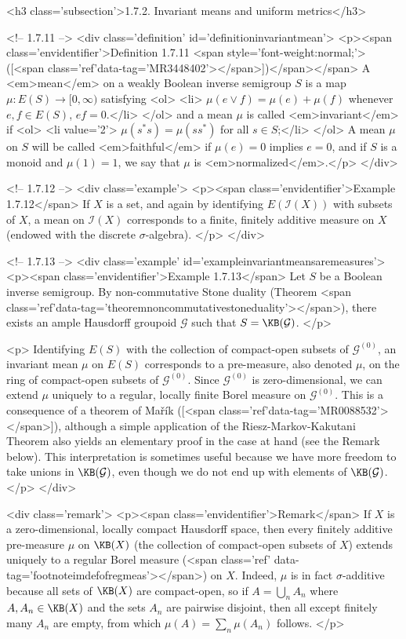 <h3 class='subsection'>1.7.2. Invariant means and uniform metrics</h3>

<!-- 1.7.11 -->
<div class='definition' id='definitioninvariantmean'>
	<p><span class='envidentifier'>Definition 1.7.11
	<span style='font-weight:normal;'>([<span class='ref'data-tag='MR3448402'></span>])</span></span>
	A <em>mean</em> on a weakly Boolean inverse semigroup $S$ is a map $\mu:E(S)\to[0,\infty)$ satisfying
	<ol>
		<li> $\mu(e\lor f)=\mu(e)+\mu(f)$ whenever $e,f\in E(S)$, $ef=0$.</li>
	</ol>
	and a mean $\mu$ is called <em>invariant</em> if
	<ol>
		<li value='2'> $\mu(s^*s)=\mu(ss^*)$ for all $s\in S$;</li>
	</ol>
	A mean $\mu$ on $S$ will be called <em>faithful</em> if $\mu(e)=0$ implies $e=0$, and if $S$ is a monoid and $\mu(1)=1$, we say that $\mu$ is <em>normalized</em>.</p>
</div>

<!-- 1.7.12 -->
<div class='example'>
	<p><span class='envidentifier'>Example 1.7.12</span>
	If $X$ is a set, and again by identifying $E(\mathcal{I}(X))$ with subsets of $X$, a mean on $\mathcal{I}(X)$ corresponds to a finite, finitely additive measure on $X$ (endowed with the discrete $\sigma$-algebra).
	</p>
</div>

<!-- 1.7.13 -->
<div class='example' id='exampleinvariantmeansaremeasures'>
	<p><span class='envidentifier'>Example 1.7.13</span>
	Let $S$ be a Boolean inverse semigroup. By non-commutative Stone duality (Theorem <span class='ref'data-tag='theoremnoncommutativestoneduality'></span>), there exists an ample Hausdorff groupoid $\mathcal{G}$ such that $S=\KB(\mathcal{G})$. 
	</p>

	<p>
	Identifying $E(S)$ with the collection of compact-open subsets of $\mathcal{G}^{(0)}$, an invariant mean $\mu$ on $E(S)$ corresponds to a pre-measure, also denoted $\mu$, on the ring of compact-open subsets of $\mathcal{G}^{(0)}$. Since $\mathcal{G}^{(0)}$ is zero-dimensional, we can extend $\mu$ uniquely to a regular, locally finite Borel measure on $\mathcal{G}^{(0)}$. This is a consequence of a theorem of Mařík ([<span class='ref'data-tag='MR0088532'></span>]), although a simple application of the Riesz-Markov-Kakutani Theorem also yields an elementary proof in the case at hand (see the Remark below). This interpretation is sometimes useful because we have more freedom to take unions in $\KB(\mathcal{G})$, even though we do not end up with elements of $\KB(\mathcal{G})$.
	</p>
</div>

<div class='remark'>
	<p><span class='envidentifier'>Remark</span>
	If $X$ is a zero-dimensional, locally compact Hausdorff space, then every finitely additive pre-measure $\mu$ on $\KB(X)$ (the collection of compact-open subsets of $X$) extends uniquely to a regular Borel measure (<span class='ref' data-tag='footnoteimdefofregmeas'></span>) on $X$. Indeed, $\mu$ is in fact $\sigma$-additive because all sets of $\KB(X)$ are compact-open, so if $A=\bigcup_n A_n$  where $A,A_n\in\KB(X)$ and the sets $A_n$ are pairwise disjoint, then all except finitely many $A_n$ are empty, from which $\mu(A)=\sum_n\mu(A_n)$ follows.
	</p>

